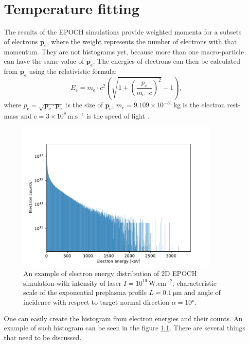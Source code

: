 \chapter{Temperature fitting}
\label{ch:temp-fitting-theory}
The results of the EPOCH simulations provide weighted momenta for a subsets of electrons $\bm{p}_\mathrm{e}$, where the weight represents the number of electrons with that momentum. They are not histograms yet, because more than one macro-particle can have the same value of $\bm{p}_\mathrm{e}$. The energies of electrons can then be calculated from $\bm{p_\mathrm{e}}$ using the relativistic formula:
\begin{equation}
	\label{eq:rel-energy}
	E_\mathrm{e} = m_\mathrm{e}\cdot c^2\left(\sqrt{1+\left(\frac{p_\mathrm{e}}{m_\mathrm{e}\cdot c}\right)^2} -1\right)\mathrm{,}
\end{equation}
where $p_\mathrm{e}=\sqrt{\bm{p}_\mathrm{e}\cdot\bm{p}_\mathrm{e}}$ is the size of $\bm{p}_\mathrm{e}$, $m_\mathrm{e} =  9.109 \times 10^{-31} \, \mathrm{kg}$ is the electron rest-mass and $c=3\times 10^{8} \, \mathrm{m . s}^{-1}$ is the speed of light \cite{mohr2016}.

\begin{figure}[h]
	\centering
	\includegraphics[width=0.9\textwidth]{figures/example-histogram}
	\caption{An example of electron energy distribution of 2D EPOCH simulation with intensity of laser $I=10^{19}\,\mathrm{W.cm}^{-2}$, characteristic scale of the exponential preplasma profile $L=0.1\,\mathrm{\mu m}$ and angle of incidence with respect to target normal direction $\alpha = 10$°.}
	\label{fig:example-histogram}
\end{figure}
One can easily create the histogram from electron energies and their counts. An example of such histogram can be seen in the figure \ref{fig:example-histogram}. There are several things that need to be discussed.

